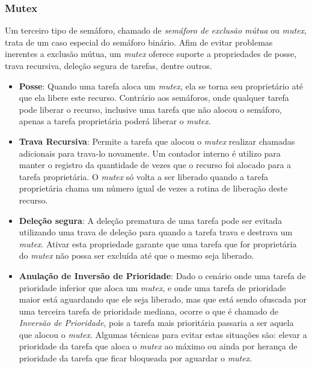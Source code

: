 

\subsubsection{Mutex}

Um terceiro tipo de semáforo, chamado de \emph{semáforo de exclusão mútua} ou \emph{mutex}, trata de um caso especial do semáforo binário. Afim de evitar problemas inerentes a exclusão mútua, um \emph{mutex} oferece suporte a propriedades de posse, trava recursiva, deleção segura de tarefas, dentre outros.

\begin{itemize}
	\item \textbf{Posse}: Quando uma tarefa aloca um \emph{mutex}, ela se torna seu proprietário até que ela libere este recurso. Contrário aos semáforos, onde qualquer tarefa pode liberar o recurso, inclusive uma tarefa que não alocou o semáforo, apenas a tarefa proprietária poderá liberar o \emph{mutex}.
	\item \textbf{Trava Recursiva}: Permite a tarefa que alocou o \emph{mutex} realizar chamadas adicionais para trava-lo novamente. Um contador interno é utilizo para manter o registro da quantidade de vezes que o recurso foi alocado para a tarefa proprietária. O \emph{mutex} só volta a ser liberado quando a tarefa proprietária chama um número igual de vezes a rotina de liberação deste recurso.
	\item \textbf{Deleção segura}: A deleção prematura de uma tarefa pode ser evitada utilizando uma trava de deleção para quando a tarefa trava e destrava um \emph{mutex}. Ativar esta propriedade garante que uma tarefa que for proprietária do \emph{mutex} não possa ser excluída até que o mesmo seja liberado.
	\item \textbf{Anulação de Inversão de Prioridade}: Dado o cenário onde uma tarefa de prioridade inferior que aloca um \emph{mutex}, e onde uma tarefa de prioridade maior está aguardando que ele seja liberado, mas que está sendo ofuscada por uma terceira tarefa de prioridade mediana, ocorre o que é chamado de \emph{Inversão de Prioridade}, pois a tarefa mais prioritária passaria a ser aquela que alocou o \emph{mutex}. Algumas técnicas para evitar estas situações são: elevar a prioridade da tarefa que aloca o \emph{mutex} ao máximo ou ainda por herança de prioridade da tarefa que ficar bloqueada por aguardar o \emph{mutex}.
\end{itemize}

